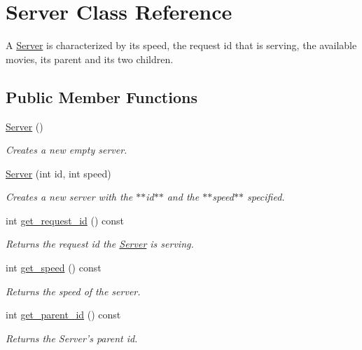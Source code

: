 \hypertarget{class_server}{
\section{Server Class Reference}
\label{class_server}
}


A \hyperlink{class_server}{Server} is characterized by its speed, the request id that is serving, the available movies, its parent and its two children.  


\subsection*{Public Member Functions}
\begin{DoxyCompactItemize}
\item 
\hyperlink{class_server_ad5ec9462b520e59f7ea831e157ee5e59}{Server} ()
\begin{DoxyCompactList}\small\item\em Creates a new empty server. \item\end{DoxyCompactList}\item 
\hyperlink{class_server_a066a75893cc4691e6bfa997a0710b354}{Server} (int id, int speed)
\begin{DoxyCompactList}\small\item\em Creates a new server with the $\ast$$\ast$id$\ast$$\ast$ and the $\ast$$\ast$speed$\ast$$\ast$ specified. \item\end{DoxyCompactList}\item 
int \hyperlink{class_server_aa464e17f9008aaee5dfc559d0828703a}{get\_\-request\_\-id} () const 
\begin{DoxyCompactList}\small\item\em Returns the request id the \hyperlink{class_server}{Server} is serving. \item\end{DoxyCompactList}\item 
int \hyperlink{class_server_a05d6f00d5bef65c071870153ae74115a}{get\_\-speed} () const 
\begin{DoxyCompactList}\small\item\em Returns the speed of the server. \item\end{DoxyCompactList}\item 
int \hyperlink{class_server_a86797118fa0842e735e5aaaccf030d37}{get\_\-parent\_\-id} () const 
\begin{DoxyCompactList}\small\item\em Returns the Server's parent id. \item\end{DoxyCompactList}\item 

\end{DoxyCompactItemize}
